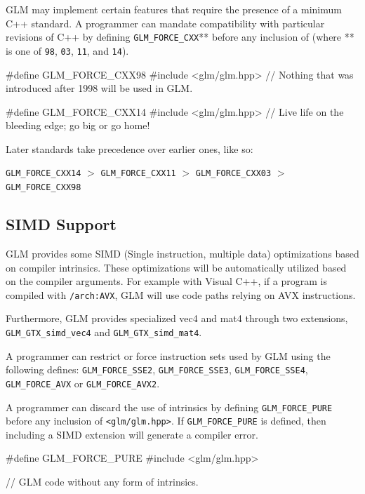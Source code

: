 \documentclass{scrartcl}
\numberwithin{figure}{subsection}
\begin{document}
GLM may implement certain features that require the presence of a minimum C++ standard. A programmer can mandate compatibility with particular revisions of C++ by defining \verb|GLM_FORCE_CXX|** before any inclusion of  (where ** is one of \verb|98|, \verb|03|, \verb|11|, and \verb|14|).

\begin{cppcode}
#define GLM_FORCE_CXX98 
#include <glm/glm.hpp>
// Nothing that was introduced after 1998 will be used in GLM.
\end{cppcode}

\begin{cppcode}
#define GLM_FORCE_CXX14 
#include <glm/glm.hpp>
// Live life on the bleeding edge; go big or go home!
\end{cppcode}

Later standards take precedence over earlier ones, like so:

\verb|GLM_FORCE_CXX14| $>$ \verb|GLM_FORCE_CXX11| $>$ \verb|GLM_FORCE_CXX03| $>$ \verb|GLM_FORCE_CXX98|

\subsection{SIMD Support}

GLM provides some SIMD (Single instruction, multiple data) optimizations based on compiler intrinsics. These optimizations will be automatically utilized based on the compiler arguments. For example with Visual C++, if a program is compiled with \verb|/arch:AVX|, GLM will use code paths relying on AVX instructions.

Furthermore, GLM provides specialized vec4 and mat4 through two extensions, \verb|GLM_GTX_simd_vec4| and \verb|GLM_GTX_simd_mat4|.

A programmer can restrict or force instruction sets used by GLM using the following defines: \verb|GLM_FORCE_SSE2|, \verb|GLM_FORCE_SSE3|, \verb|GLM_FORCE_SSE4|, \verb|GLM_FORCE_AVX| or \verb|GLM_FORCE_AVX2|.

A programmer can discard the use of intrinsics by defining \verb|GLM_FORCE_PURE| before any inclusion of \verb|<glm/glm.hpp>|. If \verb|GLM_FORCE_PURE| is defined, then including a SIMD extension will generate a compiler error.

\begin{cppcode}
#define GLM_FORCE_PURE
#include <glm/glm.hpp>

// GLM code without any form of intrinsics.
\end{cppcode}
\end{document}
